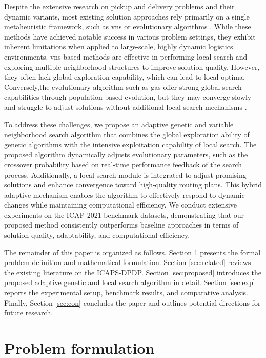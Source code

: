 \documentclass[preprint,12pt]{elsarticle}
\begin{document}
Despite the extensive research on pickup and delivery problems and their dynamic variants, most existing solution approaches rely primarily on a single metaheuristic framework, such as \gls{vns} or evolutionary algorithms \cite{horvath2025recent, voigt2025review}. While these methods have achieved notable success in various problem settings, they exhibit inherent limitations when applied to large-scale, highly dynamic logistics environments. \gls{vns}-based methods are effective in performing local search and exploring multiple neighborhood structures to improve solution quality. However, they often lack global exploration capability, which can lead to local optima. Conversely,the evolutionary algorithm such as \gls{gas} offer strong global search capabilities through population-based evolution, but they may converge slowly and struggle to adjust solutions without additional local search mechanisms \cite{cai2024decomposition, wang2024hybrid}.

To address these challenges, we propose an adaptive genetic and variable neighborhood search algorithm that combines the global exploration ability of genetic algorithms with the intensive exploitation capability of local search. The proposed algorithm dynamically adjusts evolutionary parameters, such as the crossover probability based on real-time performance feedback of the search process. Additionally, a local search module is integrated to adjust promising solutions and enhance convergence toward high-quality routing plans. This hybrid adaptive mechanism enables the algorithm to effectively respond to dynamic changes while maintaining computational efficiency. We conduct extensive experiments on the ICAP 2021 benchmark datasets, demonstrating that our proposed method consistently outperforms baseline approaches in terms of solution quality, adaptability, and computational efficiency.


The remainder of this paper is organized as follows. Section \ref{sec:problem} presents the formal problem definition and mathematical formulation. Section \ref{sec:related} reviews the existing literature on the ICAPS-DPDP.
Section \ref{sec:proposed} introduces the proposed adaptive genetic and local search algorithm in detail. Section \ref{sec:exp} reports the experimental setup, benchmark results, and comparative analysis. Finally, Section \ref{sec:con} concludes the paper and outlines potential directions for future research.

\section{Problem formulation}\label{sec:problem} 
\end{document}

